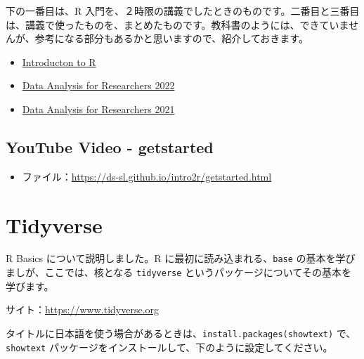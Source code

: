 \documentclass[
  xelatex, ja=standard]{bxjsbook}
\providecommand{\tightlist}{%
  \setlength{\itemsep}{0pt}\setlength{\parskip}{0pt}}
\theoremstyle{definition}
\theoremstyle{definition}
\theoremstyle{definition}
\theoremstyle{definition}
\theoremstyle{remark}
\begin{document}
下の一番目は、R 入門を、２時限の講義でしたときのものです。二番目と三番目は、講義で使ったものを、まとめたものです。教科書のようには、できていませんが、参考になる部分もあるかと思いますので、紹介しておきます。

\begin{itemize}
\tightlist
\item
  \href{https://ds-sl.github.io/intro2r/intro2r.nb.html}{Introducton to R}
\item
  \href{https://icu-hsuzuki.github.io/da4r2022/}{Data Analysis for Researchers 2022}
\item
  \href{https://icu-hsuzuki.github.io/da4r2021/}{Data Analysis for Researchers 2021}
\end{itemize}

\hypertarget{youtube-video---getstarted}{%
\section{YouTube Video - getstarted}\label{youtube-video---getstarted}}

\begin{itemize}
\tightlist
\item
  ファイル：\url{https://ds-sl.github.io/intro2r/getstarted.html}
\end{itemize}

\hypertarget{tidyverse}{%
\chapter{Tidyverse}\label{tidyverse}}

R Basics について説明しました。R に最初に読み込まれる、\texttt{base} の基本を学びましが、ここでは、核となる \texttt{tidyverse} というパッケージについてその基本を学びます。

サイト：\url{https://www.tidyverse.org}

タイトルに日本語を使う場合があるときは、\texttt{install.packages(\textquotesingle{}showtext\textquotesingle{})} で、\texttt{showtext} パッケージをインストールして、下のように設定してください。
\end{document}
